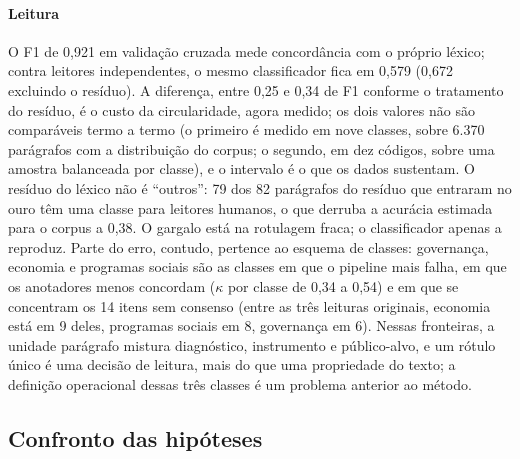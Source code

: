 \documentclass[fleqn,10pt]{SelfArx}
\begin{document}
\paragraph{Leitura} O F1 de 0,921 em validação cruzada mede concordância com o próprio léxico; contra leitores independentes, o mesmo classificador fica em 0,579 (0,672 excluindo o resíduo). A diferença, entre 0,25 e 0,34 de F1 conforme o tratamento do resíduo, é o custo da circularidade, agora medido; os dois valores não são comparáveis termo a termo (o primeiro é medido em nove classes, sobre 6.370 parágrafos com a distribuição do corpus; o segundo, em dez códigos, sobre uma amostra balanceada por classe), e o intervalo é o que os dados sustentam. O resíduo do léxico não é ``outros'': 79 dos 82 parágrafos do resíduo que entraram no ouro têm uma classe para leitores humanos, o que derruba a acurácia estimada para o corpus a 0,38. O gargalo está na rotulagem fraca; o classificador apenas a reproduz. Parte do erro, contudo, pertence ao esquema de classes: governança, economia e programas sociais são as classes em que o pipeline mais falha, em que os anotadores menos concordam ($\kappa$ por classe de 0,34 a 0,54) e em que se concentram os 14 itens sem consenso (entre as três leituras originais, economia está em 9 deles, programas sociais em 8, governança em 6). Nessas fronteiras, a unidade parágrafo mistura diagnóstico, instrumento e público-alvo, e um rótulo único é uma decisão de leitura, mais do que uma propriedade do texto; a definição operacional dessas três classes é um problema anterior ao método.

\subsection{Confronto das hipóteses}
\end{document}
